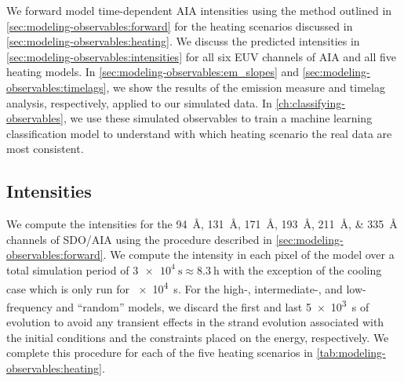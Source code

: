 We forward model time-dependent AIA intensities using the method outlined in \autoref{sec:modeling-observables:forward} for the heating scenarios discussed in \autoref{sec:modeling-observables:heating}. We discuss the predicted intensities in \autoref{sec:modeling-observables:intensities} for all six EUV channels of AIA and all five heating models. In \autoref{sec:modeling-observables:em_slopes} and \autoref{sec:modeling-observables:timelags}, we show the results of the emission measure and timelag analysis, respectively, applied to our simulated data. In \autoref{ch:classifying-observables}, we use these simulated observables to train a machine learning classification model to understand with which heating scenario the real data are most consistent.

\subsection{Intensities}\label{sec:modeling-observables:intensities}

We compute the intensities for the \SIlist{94;131;171;193;211;335}{\angstrom} channels of SDO/AIA using the procedure described in \autoref{sec:modeling-observables:forward}. We compute the intensity in each pixel of the model \AR{} over a total simulation period of $\SI{3e4}{\second}\approx\SI{8.3}{\hour}$ with the exception of the cooling case which is only run for \SI{e4}{\second}. For the high-, intermediate-, and low-frequency and ``random'' models, we discard the first and last \SI{5e3}{\second} of evolution to avoid any transient effects in the strand evolution associated with the initial conditions and the constraints placed on the energy, respectively. We complete this procedure for each of the five heating scenarios in \autoref{tab:modeling-observables:heating}.

